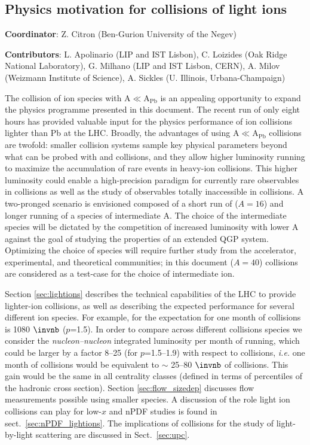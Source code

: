 \subsection{Physics motivation for collisions of light ions}
\label{sec:smallAsum}
{ \small
\noindent \textbf{Coordinator}: Z. Citron (Ben-Gurion University of the Negev)

\noindent \textbf{Contributors}:
L. Apolinario (LIP and IST Lisbon),
C. Loizides (Oak Ridge National Laboratory),
G. Milhano (LIP and IST Lisbon, CERN),
A. Milov (Weizmann Institute of Science),
A. Sickles (U. Illinois, Urbana-Champaign)
}

The collision of ion species with A$\ll$A$_\mathrm{Pb}$ is an appealing opportunity to expand the physics programme presented in this document.  The recent \XeXe run of only eight hours has provided valuable input for the physics performance of ion collisions lighter than Pb at the LHC.  Broadly, the advantages of using A$\ll$A$_\mathrm{Pb}$  collisions are twofold: smaller collision systems sample key physical parameters beyond what can be probed with \PbPb and \pPb collisions, and they allow higher luminosity running to maximize the accumulation of rare events in heavy-ion collisions.  This higher luminosity could enable a high-precision paradigm for currently rare observables in \PbPb collisions as well as the study of observables totally inaccessible in \PbPb collisions.        
A two-pronged scenario is envisioned composed of a short run of \OO  ($A=16$) and longer running of a species of intermediate A.  The choice of the intermediate species will be dictated by the competition of increased luminosity with lower A against the goal of studying the properties of an extended QGP system. Optimizing the choice of species will require further study from the accelerator, experimental, and theoretical communities; in this document \ArAr ($A=40$) collisions are considered as a test-case for the choice of intermediate ion.

Section \ref{sec:lightions} describes the technical capabilities of the LHC to provide lighter-ion collisions, as well as describing the expected performance for several different ion species.
For example, for \ArAr the expectation for one month of collisions is 1080 $\invnb$ ($p$=1.5).  In order to compare across different collisions species we consider the \textit{nucleon--nucleon} integrated luminosity per month of running, which could be larger by a factor 8--25 (for $p$=1.5--1.9) with respect to \PbPb collisions, \textit{i.e.} one month of \ArAr collisions would be equivalent to $\sim$ 25--80 $\invnb$ of \PbPb collisions. This gain would be the same in all centrality classes (defined in terms of percentiles of the hadronic cross section).
Section \ref{sec:flow_sizedep} discusses flow measurements possible using smaller species.  A discussion of the role light ion collisions can play for low-$x$ and nPDF studies is found in sect.~\ref{sec:nPDF_lightions}.  The implications of \ArAr collisions for the study of light-by-light scattering are discussed in Sect.~\ref{sec:upc}. 

